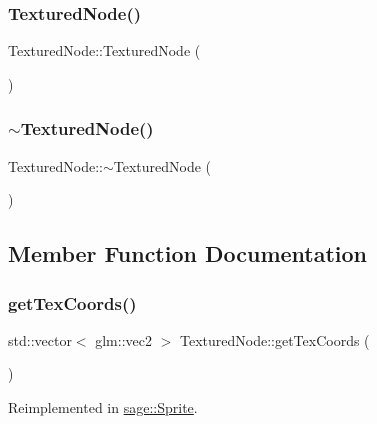 \subsubsection{\texorpdfstring{TexturedNode()}{TexturedNode()}}
{\footnotesize\ttfamily Textured\+Node\+::\+Textured\+Node (\begin{DoxyParamCaption}{ }\end{DoxyParamCaption})}

\mbox{\label{classsage_1_1TexturedNode_a2c67c0ec8c8839308a56e0aea6839b3e}} 
\subsubsection{\texorpdfstring{$\sim$TexturedNode()}{~TexturedNode()}}
{\footnotesize\ttfamily Textured\+Node\+::$\sim$\+Textured\+Node (\begin{DoxyParamCaption}{ }\end{DoxyParamCaption})}



\subsection{Member Function Documentation}
\mbox{\label{classsage_1_1TexturedNode_ada858d240f8074fd97e8a72e74d18a30}} 
\subsubsection{\texorpdfstring{getTexCoords()}{getTexCoords()}}
{\footnotesize\ttfamily std\+::vector$<$ glm\+::vec2 $>$ Textured\+Node\+::get\+Tex\+Coords (\begin{DoxyParamCaption}{ }\end{DoxyParamCaption})\hspace{0.3cm}{\ttfamily [virtual]}}



Reimplemented in \mbox{\hyperlink{classsage_1_1Sprite_a3e5acc98484d2f326fdd1ff622cfd2ff}{sage\+::\+Sprite}}.

\mbox{\label{classsage_1_1TexturedNode_a079cea0b12a1d0e3ea69459546736c0f}} 

